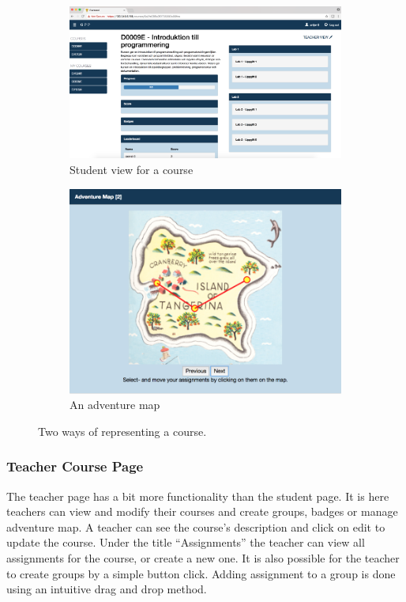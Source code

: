 \begin{figure}[H]
    \begin{subfigure}{.48\linewidth}
        \centering
        \includegraphics[width=\textwidth]{img/gppinpictures/studentview.png}
        \caption{Student view for a course}
        \label{fig:student}
    \end{subfigure}
    \hfill
    \begin{subfigure}{.48\linewidth}
        \centering
        \includegraphics[width=\textwidth]{img/gppinpictures/adventuremap.png}
        \caption{An adventure map}
        \label{fig:student}
    \end{subfigure}
    \caption{Two ways of representing a course.}
\end{figure}

\subsubsection{Teacher Course Page}
The teacher page has a bit more functionality than the student page. It is here teachers can view and modify their courses and create groups, badges or manage adventure map. A teacher can see the course's description and click on edit to update the course. Under the title ``Assignments'' the teacher can view all assignments for the course, or create a new one. It is also possible for the teacher to create groups by a simple button click. Adding assignment to a group is done using an intuitive drag and drop method. 

